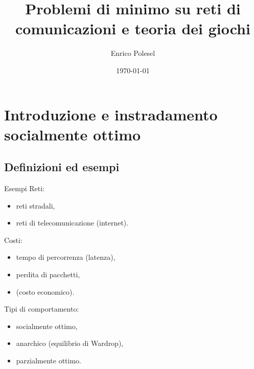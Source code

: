 \documentclass{beamer}
\title{Problemi di minimo su reti di comunicazioni e teoria dei giochi}
\date{\today}
\author{Enrico Polesel}
\theoremstyle{plain}
\theoremstyle{definition}
\theoremstyle{remark}
\begin{document}
\maketitle



\section{Introduzione e instradamento socialmente ottimo}

\subsection{Definizioni ed esempi}

\begin{frame}{Esempi}
  Reti:
  \begin{itemize}
  \item reti stradali,
  \item reti di telecomunicazione (internet).
  \end{itemize}

  Costi:
  \begin{itemize}
  \item tempo di percorrenza (latenza),
  \item perdita di pacchetti,
  \item (costo economico).
  \end{itemize}

  Tipi di comportamento:
  \begin{itemize}
  \item socialmente ottimo,
  \item anarchico (equilibrio di Wardrop),
  \item parzialmente ottimo.
  \end{itemize}
\end{frame}
\end{document}
